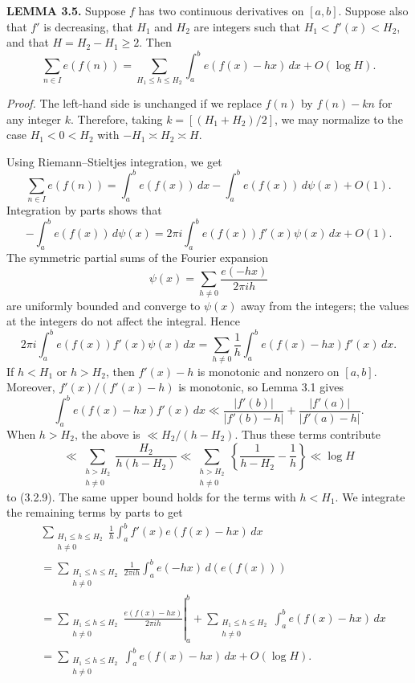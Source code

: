 \documentclass[10pt]{article}
\begin{document}
\medskip
\noindent\textbf{LEMMA 3.5.}
Suppose $f$ has two continuous derivatives on $[a,b]$. Suppose also that $f'$
is decreasing, that $H_1$ and $H_2$ are integers such that
$H_1<f'(x)<H_2$, and that $H=H_2-H_1\geq2$. Then
\[
 \sum_{n\in I}e(f(n))
 =\sum_{H_1\leq h\leq H_2}\int_a^b e(f(x)-hx)\,dx+O(\log H).
\]

\noindent\textit{Proof.}
The left-hand side is unchanged if we replace $f(n)$ by $f(n)-kn$ for any
integer $k$. Therefore, taking $k=[(H_1+H_2)/2]$, we may normalize to the
case $H_1<0<H_2$ with $-H_1\asymp H_2\asymp H$.

Using Riemann--Stieltjes integration, we get
\begin{equation*}
 \sum_{n\in I}e(f(n))
 =\int_a^b e(f(x))\,dx-\int_a^b e(f(x))\,d\psi(x)+O(1). \tag{3.2.8}
\end{equation*}
Integration by parts shows that
\[
 -\int_a^b e(f(x))\,d\psi(x)
 =2\pi i\int_a^b e(f(x))f'(x)\psi(x)\,dx+O(1).
\]
The symmetric partial sums of the Fourier expansion
\[
 \psi(x)=\sum_{h\neq0}\frac{e(-hx)}{2\pi i h}
\]
are uniformly bounded and converge to $\psi(x)$ away from the integers; the
values at the integers do not affect the integral. Hence
\begin{equation*}
 2\pi i\int_a^b e(f(x))f'(x)\psi(x)\,dx
 =\sum_{h\neq0}\frac1h\int_a^b e(f(x)-hx)f'(x)\,dx. \tag{3.2.9}
\end{equation*}
If $h<H_1$ or $h>H_2$, then $f'(x)-h$ is monotonic and nonzero on $[a,b]$.
Moreover, $f'(x)/(f'(x)-h)$ is monotonic, so Lemma 3.1 gives
\[
 \int_a^b e(f(x)-hx)f'(x)\,dx
 \ll\frac{|f'(b)|}{|f'(b)-h|}+\frac{|f'(a)|}{|f'(a)-h|}.
\]
When $h>H_2$, the above is $\ll H_2/(h-H_2)$. Thus these terms contribute
\[
 \ll\sum_{\substack{h>H_2\\h\neq0}}\frac{H_2}{h(h-H_2)}
 \ll\sum_{\substack{h>H_2\\h\neq0}}
 \left\{\frac1{h-H_2}-\frac1h\right\}
 \ll\log H
\]
to (3.2.9). The same upper bound holds for the terms with $h<H_1$. We
integrate the remaining terms by parts to get
\[
\begin{aligned}
 &\sum_{\substack{H_1\leq h\leq H_2\\h\neq0}}
   \frac1h\int_a^b f'(x)e(f(x)-hx)\,dx \\
 &=\sum_{\substack{H_1\leq h\leq H_2\\h\neq0}}
   \frac1{2\pi i h}\int_a^b e(-hx)\,d(e(f(x))) \\
 &=\left.\sum_{\substack{H_1\leq h\leq H_2\\h\neq0}}
   \frac{e(f(x)-hx)}{2\pi i h}\right|_a^b
   +\sum_{\substack{H_1\leq h\leq H_2\\h\neq0}}
   \int_a^b e(f(x)-hx)\,dx \\
 &=\sum_{\substack{H_1\leq h\leq H_2\\h\neq0}}
   \int_a^b e(f(x)-hx)\,dx+O(\log H).
\end{aligned}
\]
\end{document}
